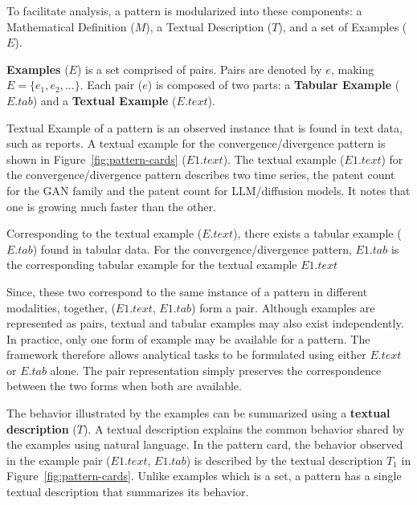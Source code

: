 \documentclass[sigconf,nonacm,anonymous]{acmart}
\begin{document}
To facilitate analysis, a pattern is modularized into these components: a Mathematical Definition ($M$), a Textual Description ($T$), and a set of Examples ($E$).

\textbf{Examples} ($E$) is a set comprised of pairs.
Pairs are denoted by $e$, making $E = \{e_1, e_2, ...\}$. 
Each pair ($e$) is composed of two parts: a \textbf{Tabular Example} 
($E.tab$) and a \textbf{Textual Example} ($E.text$).

Textual Example of a pattern is an observed instance that is found in text data, such as reports. A textual example for the 
convergence/divergence pattern is shown in Figure~\ref{fig:pattern-cards} 
($E1.text$). The textual example ($E1.text$) for the convergence/divergence pattern describes two time series, the patent count for the GAN family and the patent count for LLM/diffusion models. It notes that one is growing much faster than the other.

Corresponding to the textual example ($E.text$), there exists a tabular example ($E.tab$) found in tabular data. For the convergence/divergence pattern, $E1.tab$ is the corresponding tabular example for the textual example $E1.text$

Since, these two correspond to the same instance of a pattern in different modalities, together, ($E1.text$, $E1.tab$) form a pair. Although examples are represented as pairs, textual and tabular examples may also exist independently. In practice, only one form of example may be available for a pattern. The framework therefore allows analytical tasks to be formulated using either $E.text$ or $E.tab$ alone. The pair representation simply preserves the correspondence between the two forms when both are available.

The behavior illustrated by the examples can be summarized using a 
\textbf{textual description} ($T$). A textual description explains the 
common behavior shared by the examples using natural language. In the 
pattern card, the behavior observed in the example pair ($E1.text$, $E1.tab$) is 
described by the textual description $T_1$ in 
Figure~\ref{fig:pattern-cards}. Unlike examples which is a set, a pattern has a single textual description that summarizes 
its behavior.

\end{document}
